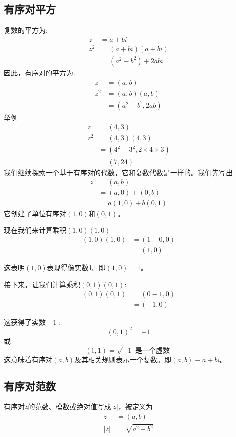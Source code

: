 \subsection{有序对平方}
复数的平方为:
$$
\begin{aligned}
z & =a+b i \\
z^{2} & =(a+b i)(a+b i) \\
& =\left(a^{2}-b^{2}\right)+2 a b i
\end{aligned}
$$
因此，有序对的平方为:
$$
\begin{aligned}
z & =(a, b) \\
z^{2} & =(a, b)(a, b) \\
& =\left(a^{2}-b^{2}, 2 a b\right)
\end{aligned}
$$
举例
$$
\begin{aligned}
z & =(4,3) \\
z^{2} & =(4,3)(4,3) \\
& =\left(4^{2}-3^{2}, 2 \times 4 \times 3\right) \\
& =(7,24)
\end{aligned}
$$
我们继续探索一个基于有序对的代数，它和复数代数是一样的。我们先写出
$$
\begin{aligned}
z & =(a, b) \\
& =(a, 0)+(0, b) \\
& =a(1,0)+b(0,1)
\end{aligned}
$$
它创建了单位有序对$(1,0)$和$(0,1)$。

现在我们来计算乘积$(1,0)(1,0)$
$$
\begin{aligned}
(1,0)(1,0) & =(1-0,0) \\
& =(1,0)
\end{aligned}
$$

这表明$(1,0)$表现得像实数1。即$(1,0)=1$。

接下来，让我们计算乘积$(0,1)(0,1)$:
$$
\begin{aligned}
(0,1)(0,1) & =(0-1,0) \\
& =(-1,0)
\end{aligned}
$$

这获得了实数 $-1$ :
$$
(0,1)^{2}=-1
$$
或
$$
(0,1)=\sqrt{-1} \text { 是一个虚数 }
$$
这意味着有序对$(a, b)$及其相关规则表示一个复数。即$(a, b) \equiv a+b i$。

\subsection{有序对范数}
有序对$z$的范数、模数或绝对值写成$|z|$，被定义为
$$
\begin{aligned}
z & =(a, b) \\
|z| & =\sqrt{a^{2}+b^{2}}
\end{aligned}
$$

